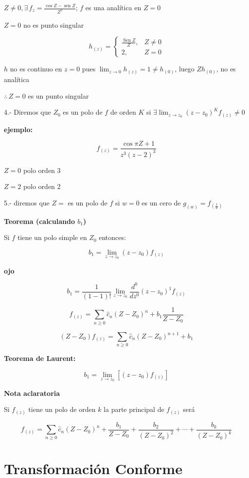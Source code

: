 \documentclass[a4paper,12pt]{article}
\begin{document}
$Z \neq 0, \exists \, f_z = \frac{\cos Z - \operatorname{sen} Z}{Z^2} ; \, f$ es una analítica en $Z = 0$

$Z = 0$ no es punto singular

\[ h_{(z)} = \begin{cases}
\frac{\operatorname{Sen} Z}{Z}, & Z \neq 0 \\
2, & Z = 0
\end{cases} \]

$h$ no es continuo en $z = 0$ pues $\lim_{z \to 0} h_{(z)} = 1 \neq h_{(0)}$, luego $Z h_{(0)}$, no es analítica

$\therefore \, Z = 0$ es un punto singular

4.- Diremos que $Z_0$ es un polo de $f$ de orden $K$ si $\exists \lim_{z \to z_0} (z - z_0)^K f_{(z)} \neq 0$

\textbf{ejemplo:}

\[ f_{(z)} = \frac{\cos \pi Z + 1}{z^3 (z - 2)^3} \]

$Z = 0$ polo orden 3

$Z = 2$ polo orden 2

5.- diremos que $Z =$ es un polo de $f$ si $w = 0$ es un cero de $g_{(w)} = f_{\left(\frac{1}{w}\right)}$



\textbf{Teorema (calculando $b_1$)}

Si $f$ tiene un polo simple en $Z_0$ entonces:

\[ b_1 = \lim_{z \to z_0} (z - z_0) f_{(z)} \]

\textbf{ojo}

\[ b_1 = \frac{1}{(1-1)!} \lim_{z \to z_0} \frac{d^0}{dz^0} (z - z_0)^1 f_{(z)} \]

\[ f_{(z)} = \sum_{n \geq 0} \hat{c}_n (Z - Z_0)^n + b_1 \frac{1}{Z - Z_0} \]

\[ (Z - Z_0) f_{(z)} = \sum_{n \geq 0} \hat{c}_n (Z - Z_0)^{n+1} + b_1 \]

\textbf{Teorema de Laurent:}

\[ b_1 = \lim_{z \to z_0} \left[(z - z_0) f_{(z)}\right] \]

\textbf{Nota aclaratoria}

Si $f_{(z)}$ tiene un polo de orden $k$ la parte principal de $f_{(z)}$ será

\[ f_{(z)} = \sum_{n \geq 0} \hat{c}_n (Z - Z_0)^n + \frac{b_1}{Z - Z_0} + \frac{b_2}{(Z - Z_0)^2} + \cdots + \frac{b_k}{(Z - Z_0)^k} \]

\newpage
\section{Transformación Conforme}
\end{document}
